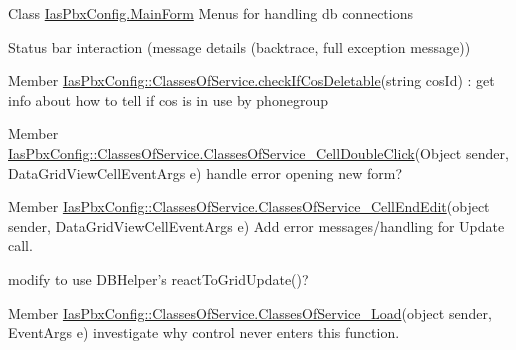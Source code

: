 \label{todo__todo000037}
\hypertarget{todo__todo000037}{}
 
\begin{DoxyDescription}
\item[Class \hyperlink{class_ias_pbx_config_1_1_main_form}{IasPbxConfig.MainForm} ]Menus for handling db connections 

Status bar interaction (message details (backtrace, full exception message)) 
\end{DoxyDescription}

\label{todo__todo000001}
\hypertarget{todo__todo000001}{}
 
\begin{DoxyDescription}
\item[Member \hyperlink{class_ias_pbx_config_1_1_classes_of_service_a1c71bf32df4e9f1c83dfb22383f54188}{IasPbxConfig::ClassesOfService.checkIfCosDeletable}(string cosId) ]: get info about how to tell if cos is in use by phonegroup 
\end{DoxyDescription}

\label{todo__todo000004}
\hypertarget{todo__todo000004}{}
 
\begin{DoxyDescription}
\item[Member \hyperlink{class_ias_pbx_config_1_1_classes_of_service_af8689629d28f48c61a3136122b8fb62d}{IasPbxConfig::ClassesOfService.ClassesOfService\_\-CellDoubleClick}(Object sender, DataGridViewCellEventArgs e) ]handle error opening new form? 
\end{DoxyDescription}

\label{todo__todo000005}
\hypertarget{todo__todo000005}{}
 
\begin{DoxyDescription}
\item[Member \hyperlink{class_ias_pbx_config_1_1_classes_of_service_a8353a8ba4d45caf1c2feebb4ca79b07e}{IasPbxConfig::ClassesOfService.ClassesOfService\_\-CellEndEdit}(object sender, DataGridViewCellEventArgs e) ]Add error messages/handling for Update call. 

modify to use DBHelper's reactToGridUpdate()? 
\end{DoxyDescription}

\label{todo__todo000003}
\hypertarget{todo__todo000003}{}
 
\begin{DoxyDescription}
\item[Member \hyperlink{class_ias_pbx_config_1_1_classes_of_service_a289f97c10a4bc8cf69521227e97ed4c5}{IasPbxConfig::ClassesOfService.ClassesOfService\_\-Load}(object sender, EventArgs e) ]investigate why control never enters this function. 
\end{DoxyDescription}

